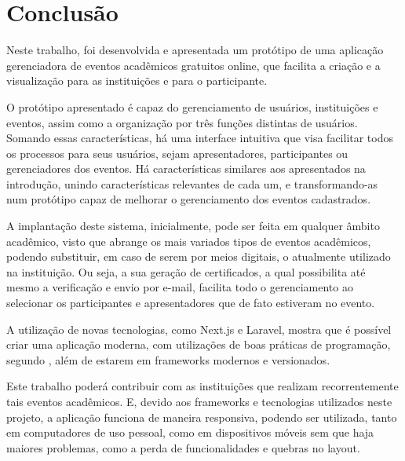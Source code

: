 \chapter{Conclusão}\label{chp:LABEL_CHP_6}

Neste trabalho, foi desenvolvida e apresentada um protótipo de uma aplicação gerenciadora de eventos acadêmicos gratuitos online, que facilita a criação e a visualização para as instituições e para o participante.

O protótipo apresentado é capaz do gerenciamento de usuários, instituições e eventos, assim como a organização por três funções distintas de usuários. Somando essas características, há uma interface intuitiva que visa facilitar todos os processos para seus usuários, sejam apresentadores, participantes ou gerenciadores dos eventos. Há características similares aos apresentados na introdução, unindo características relevantes de cada um, e transformando-as num protótipo capaz de melhorar o gerenciamento dos eventos cadastrados.

A implantação deste sistema, inicialmente, pode ser feita em qualquer âmbito acadêmico, visto que abrange os mais variados tipos de eventos acadêmicos, podendo substituir, em caso de serem por meios digitais, o atualmente utilizado na instituição. Ou seja, a sua geração de certificados, a qual possibilita até mesmo a verificação e envio por e-mail, facilita todo o gerenciamento ao selecionar os participantes e apresentadores que de fato estiveram no evento.

A utilização de novas tecnologias, como Next.js e Laravel, mostra que é possível criar uma aplicação moderna, com utilizações de boas práticas de programação, segundo , além de estarem em frameworks modernos e versionados. 

Este trabalho poderá contribuir com as instituições que realizam recorrentemente tais eventos acadêmicos.  E, devido aos frameworks e tecnologias utilizados neste projeto, a aplicação funciona de maneira responsiva, podendo ser utilizada, tanto em computadores de uso pessoal, como em dispositivos móveis sem que haja maiores problemas, como a perda de funcionalidades e quebras no layout.


